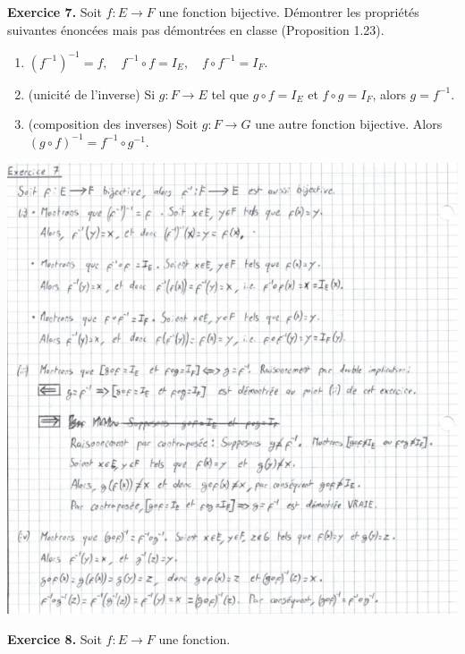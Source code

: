 \documentclass[a4paper, 10pt]{report}
\begin{document}
	\newpage
	
	\noindent
	\textbf{Exercice 7.} Soit $f: E \to F$ une fonction bijective.
	Démontrer les propriétés suivantes énoncées mais pas démontrées
	en classe (Proposition 1.23).
	
	\begin{enumerate}[label=(\roman*)]
		\item $(f^{-1})^{-1} = f, \quad
			f^{-1} \circ f = I_E, \quad
			f \circ f^{-1} = I_F$.
		\item (unicité de l'inverse) Si $g : F \to E$ tel que
		$g \circ f = I_E$ et $f \circ g = I_F$, alors $g = f^{-1}$.
		\item (composition des inverses) Soit $g : F \to G$ une autre
		fonction bijective. Alors
		$(g \circ f)^{-1} = f^{-1} \circ g^{-1}$.
	\end{enumerate}
		
	\includegraphics{ex07.jpg}
	
	\newpage
	
	\noindent
	\textbf{Exercice 8.} Soit $f : E \to F$ une fonction.
	
\end{document}
